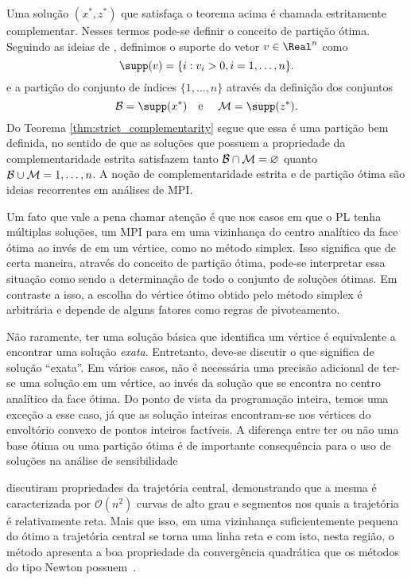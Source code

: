  

Uma solução $(x^*,z^*)$ que satisfaça o teorema acima é chamada estritamente
complementar. Nesses termos pode-se definir o conceito de partição ótima.
Seguindo as ideias de \textcite{Jansen:1997vy}, definimos o suporte do vetor
$v\in\Real^n$ como
\[
\supp(v) = \{i:v_i>0, i=1,\ldots,n\}.
\]
e a partição do conjunto de índices $\{1,\ldots,n\}$ através da definição dos
conjuntos 
\[
\Bset = \supp(x^*) \text{\quad e \quad } \Mset = \supp(z^*).
\]
Do Teorema \ref{thm:strict_complementarity} segue que essa é uma partição bem
definida, no sentido de que as soluções que possuem a propriedade da
complementaridade estrita satisfazem tanto $\mathcal{B}\cap \mathcal{M} = \varnothing$
quanto $\mathcal{B}\cup\mathcal{M} = {1,\ldots,n}$. A noção de complementaridade estrita e
de partição ótima são ideias recorrentes em análises de \ac{MPI}.

Um  fato que vale a pena chamar atenção é que nos casos em que o \ac{PL}
tenha múltiplas soluções, um \ac{MPI} para em uma vizinhança do 
centro analítico da face ótima ao invés de em um vértice, como no método
simplex. Isso significa que de certa maneira, através do conceito de partição
ótima,  pode-se interpretar essa situação como sendo a determinação de
todo o conjunto de soluções ótimas. Em contraste a isso, a escolha do vértice ótimo obtido pelo
método simplex é arbitrária e depende de alguns fatores como regras de
pivoteamento. 

Não raramente, ter uma solução básica que identifica um vértice é equivalente a
encontrar uma solução \emph{exata}. Entretanto, deve-se discutir o que significa de
solução ``exata''. Em vários casos, não é necessária uma precisão adicional de
ter-se uma solução em um vértice, ao invés da solução que se encontra no centro
analítico da face ótima.  Do ponto de vista da programação inteira, temos uma
exceção a esse caso, já que as solução inteiras encontram-se nos vértices do
envoltório convexo de pontos inteiros factíveis. A diferença entre ter ou não
uma base ótima ou uma partição ótima é de importante consequência para o uso de
soluções na análise de sensibilidade \cite{Jansen:1997vy,Yildirim:2001gp}


\textcite{Vavasis:1996bw}
discutiram propriedades da trajetória central, demonstrando que a mesma é caracterizada por
$\mathcal{O}(n^2)$ curvas de alto grau e segmentos nos quais a trajetória é
relativamente reta. Mais que isso, em uma vizinhança
suficientemente pequena do ótimo a trajetória central se torna uma linha reta
e com isto, nesta região, o método apresenta a boa propriedade da convergência quadrática que os métodos do tipo
Newton possuem~\cite{Meggido:Pathways-to-the-optimal:1988u}.
 


